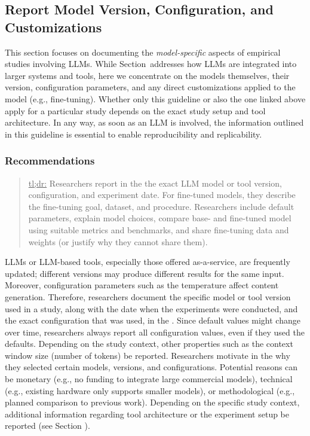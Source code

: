 



\subsection{Report Model Version, Configuration, and Customizations}

This section focuses on documenting the \emph{model-specific} aspects of empirical studies involving LLMs.
While Section~\toolarchitecture addresses how LLMs are integrated into larger systems and tools, here we concentrate on the models themselves, their version, configuration parameters, and any direct customizations applied to the model (e.g., fine-tuning).
Whether only this guideline or also the one linked above apply for a particular study depends on the exact study setup and tool architecture.
In any way, as soon as an LLM is involved, the information outlined in this guideline is essential to enable reproducibility and replicability.

\subsubsection{Recommendations}

\begin{quote}
\underline{tl;dr:} Researchers \must report in the \paper the exact LLM model or tool version, configuration, and experiment date. For fine-tuned models, they \must describe the fine-tuning goal, dataset, and procedure. Researchers \should include default parameters, explain model choices, compare base- and fine-tuned model using suitable metrics and benchmarks, and share fine-tuning data and weights (or justify why they cannot share them).
\end{quote}

LLMs or LLM-based tools, especially those offered as-a-service, are frequently updated; different versions may produce different results for the same input.
Moreover, configuration parameters such as the temperature affect content generation.
Therefore, researchers \must document the specific model or tool version used in a study, along with the date when the experiments were conducted, and the exact configuration that was used, in the \paper.
Since default values might change over time, researchers \should always report all configuration values, even if they used the defaults.
Depending on the study context, other properties such as the context window size (number of tokens) \may be reported.
Researchers \should motivate in the \paper why they selected certain models, versions, and configurations.
Potential reasons can be monetary (e.g., no funding to integrate large commercial models), technical (e.g., existing hardware only supports smaller models), or methodological (e.g., planned comparison to previous work).
Depending on the specific study context, additional information regarding tool architecture or the experiment setup \should be reported (see Section \toolarchitecture).

